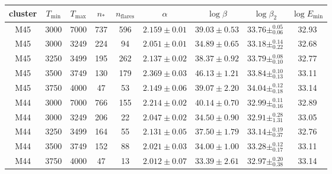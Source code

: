 \begin{tabular}{ccccccccc}
\toprule
   cluster &  $T_\mathrm{min}$ &  $T_\mathrm{max}$ &      $n_*$ &  $n_\mathrm{flares}$ &        $\alpha$ &     $\log\beta$ &             $\log\beta_2$ & $\log E_\mathrm{min}$ \\
\midrule
       M45 &              3000 &              7000 &        737 &                  596 &  $2.159\pm0.01$ &  $39.03\pm0.53$ &  $33.76\pm^{0.05}_{0.06}$ &                 32.93 \\
       M45 &              3000 &              3249 &        224 &                   94 &  $2.051\pm0.01$ &  $34.89\pm0.65$ &  $33.18\pm^{0.14}_{0.22}$ &                 32.68 \\
       M45 &              3250 &              3499 &        195 &                  262 &  $2.137\pm0.02$ &  $38.37\pm0.92$ &  $33.79\pm^{0.08}_{0.10}$ &                 32.77 \\
       M45 &              3500 &              3749 &        130 &                  179 &  $2.369\pm0.03$ &  $46.13\pm1.21$ &  $33.84\pm^{0.10}_{0.13}$ &                 33.11 \\
       M45 &              3750 &              4000 &         47 &                   53 &  $2.149\pm0.06$ &  $39.07\pm2.20$ &  $34.04\pm^{0.12}_{0.18}$ &                 33.14 \\
       M44 &              3000 &              7000 &        766 &                  155 &  $2.214\pm0.02$ &  $40.14\pm0.70$ &  $32.99\pm^{0.11}_{0.16}$ &                 32.89 \\
       M44 &              3000 &              3249 &        206 &                   22 &  $2.047\pm0.02$ &  $34.50\pm0.90$ &  $32.91\pm^{0.28}_{1.31}$ &                 33.05 \\
       M44 &              3250 &              3499 &        164 &                   55 &  $2.131\pm0.05$ &  $37.50\pm1.79$ &  $33.14\pm^{0.19}_{0.37}$ &                 32.76 \\
       M44 &              3500 &              3749 &        152 &                   88 &  $2.021\pm0.03$ &  $34.00\pm1.00$ &  $33.28\pm^{0.12}_{0.17}$ &                 33.11 \\
       M44 &              3750 &              4000 &         47 &                   13 &  $2.012\pm0.07$ &  $33.39\pm2.61$ &  $32.97\pm^{0.20}_{0.38}$ &                 33.14 \\
\bottomrule
\end{tabular}
